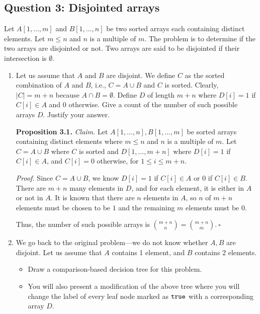 \subsection*{Question 3: Disjointed arrays}
Let $A[1,\ldots,m]$ and $B[1,\ldots,n]$ be two sorted
arrays each containing distinct elements. Let
$m\leq n$ and $n$ is a multiple of $m$. 
The problem is to determine if the two arrays
are disjointed or not. Two arrays are said
to be disjointed if their intersection is
$\emptyset$. 

\begin{enumerate}
	\item Let us assume that $A$ and $B$ are disjoint.
	We define $C$ as the sorted combination of
	$A$ and $B$, i.e., $C=A\cup B$ and $C$ is sorted. Clearly,
	$|C|=m+n$ because $A\cap B=\emptyset$. Define
	$D$ of length $m+n$ where $D[i]=1$ if $C[i]\in A$ and 0
	otherwise. Give a count of the number of such possible
	arrays $D$. Justify your answer. 

\begin{solution}
\textbf{Proposition 3.1.}
\textit{Claim. }Let $A[1,\dots,n],B[1,\dots,m]$ be sorted arrays containing distinct elements where $m\leq n$ and $n$ is a multiple of $m$. Let $C=A\cup B$ where $C$ is sorted and $D[1,\dots,m+n]$ where $D[i]=1$ if $C[i]\in A$, and $C[i]=0$ otherwise, for $1\leq i\leq m+n$.

\textit{Proof. }Since $C=A\cup B$, we know $D[i]=1$ if $C[i]\in A$ or $0$ if $C[i]\in B$. There are $m+n$ many elements in $D$, and for each element, it is either in $A$ or not in $A$. It is known that there are $n$ elements in $A$, so $n$ of $m+n$ elements must be chosen to be $1$ and the remaining $m$ elements must be $0$.

Thus, the number of such possible arrays is $\binom{m+n}{n}=\binom{m+n}{m}$.$~\square$
\end{solution}
\newpage
\item We go back to the original problem---we do not know whether $A,B$ are disjoint. Let us assume that $A$ contains 1 element, and $B$ contains 2 elements. 

\begin{itemize}
\item Draw a comparison-based decision tree for this problem.
\item You will also present a modification of the above tree
where you will change the label of every leaf node marked as $\mathtt{true}$ 
with a corresponding array $D$. 
\end{itemize}


\end{enumerate}
